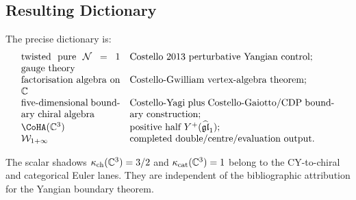 \subsection{Resulting Dictionary}

The precise dictionary is:
\[
\begin{array}{p{0.30\linewidth}p{0.62\linewidth}}
twisted pure \(\mathcal N=1\) gauge theory &
Costello 2013 perturbative Yangian control;\\
factorisation algebra on \(\mathbb C\) &
Costello-Gwilliam vertex-algebra theorem;\\
five-dimensional boundary chiral algebra &
Costello-Yagi plus Costello-Gaiotto/CDP boundary construction;\\
\(\CoHA(\mathbb C^3)\) &
positive half \(Y^+(\gghone)\);\\
\(\mathcal W_{1+\infty}\) &
completed double/centre/evaluation output.
\end{array}
\]

The scalar shadows \(\kappa_{\mathrm{ch}}(\mathbb C^3)=3/2\) and
\(\kappa_{\mathrm{cat}}(\mathbb C^3)=1\) belong to the CY-to-chiral and categorical
Euler lanes.  They are independent of the bibliographic attribution for
the Yangian boundary theorem.

